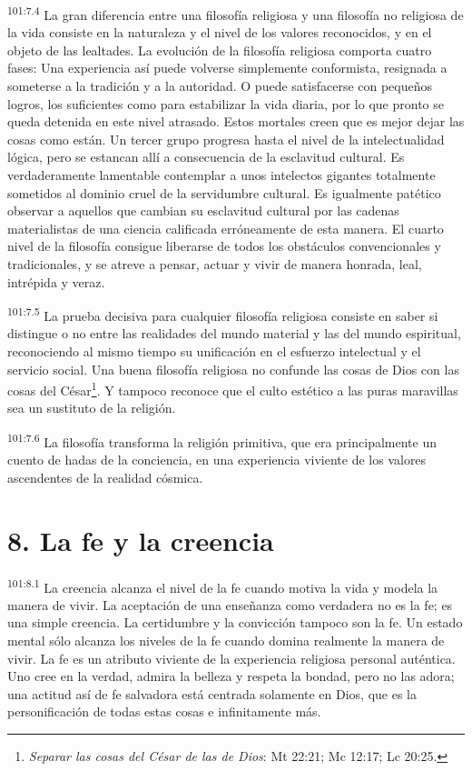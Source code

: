 \documentclass[twoside, 11pt]{book}
\begin{document}
\par
\textsuperscript{101:7.4} La gran diferencia entre una filosofía religiosa y una filosofía no religiosa de la vida consiste en la naturaleza y el nivel de los valores reconocidos, y en el objeto de las lealtades. La evolución de la filosofía religiosa comporta cuatro fases: Una experiencia así puede volverse simplemente conformista, resignada a someterse a la tradición y a la autoridad. O puede satisfacerse con pequeños logros, los suficientes como para estabilizar la vida diaria, por lo que pronto se queda detenida en este nivel atrasado. Estos mortales creen que es mejor dejar las cosas como están. Un tercer grupo progresa hasta el nivel de la intelectualidad lógica, pero se estancan allí a consecuencia de la esclavitud cultural. Es verdaderamente lamentable contemplar a unos intelectos gigantes totalmente sometidos al dominio cruel de la servidumbre cultural. Es igualmente patético observar a aquellos que cambian su esclavitud cultural por las cadenas materialistas de una ciencia calificada erróneamente de esta manera. El cuarto nivel de la filosofía consigue liberarse de todos los obstáculos convencionales y tradicionales, y se atreve a pensar, actuar y vivir de manera honrada, leal, intrépida y veraz.

\par
\textsuperscript{101:7.5} La prueba decisiva para cualquier filosofía religiosa consiste en saber si distingue o no entre las realidades del mundo material y las del mundo espiritual, reconociendo al mismo tiempo su unificación en el esfuerzo intelectual y el servicio social. Una buena filosofía religiosa no confunde las cosas de Dios con las cosas del César\footnote{\textit{Separar las cosas del César de las de Dios}: Mt 22:21; Mc 12:17; Lc 20:25.}. Y tampoco reconoce que el culto estético a las puras maravillas sea un sustituto de la religión.

\par
\textsuperscript{101:7.6} La filosofía transforma la religión primitiva, que era principalmente un cuento de hadas de la conciencia, en una experiencia viviente de los valores ascendentes de la realidad cósmica.

\section*{8. La fe y la creencia}
\par
\textsuperscript{101:8.1} La creencia alcanza el nivel de la fe cuando motiva la vida y modela la manera de vivir. La aceptación de una enseñanza como verdadera no es la fe; es una simple creencia. La certidumbre y la convicción tampoco son la fe. Un estado mental sólo alcanza los niveles de la fe cuando domina realmente la manera de vivir. La fe es un atributo viviente de la experiencia religiosa personal auténtica. Uno cree en la verdad, admira la belleza y respeta la bondad, pero no las adora; una actitud así de fe salvadora está centrada solamente en Dios, que es la personificación de todas estas cosas e infinitamente más.
\end{document}
